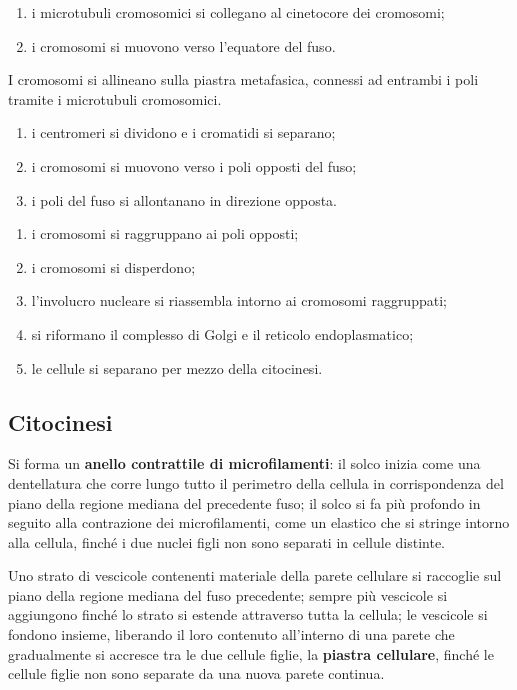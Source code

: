 \begin{enumerate}
  \item i microtubuli cromosomici si collegano al cinetocore dei cromosomi;
  \item i cromosomi si muovono verso l'equatore del fuso.
\end{enumerate}

I cromosomi si allineano sulla piastra metafasica, connessi ad entrambi i poli tramite i microtubuli cromosomici.

\begin{enumerate}
  \item i centromeri si dividono e i cromatidi si separano;
  \item i cromosomi si muovono verso i poli opposti del fuso;
  \item i poli del fuso si allontanano in direzione opposta.
\end{enumerate}

\begin{enumerate}
  \item i cromosomi si raggruppano ai poli opposti;
  \item i cromosomi si disperdono;
  \item l'involucro nucleare si riassembla intorno ai cromosomi raggruppati;
  \item si riformano il complesso di Golgi e il reticolo endoplasmatico;
  \item le cellule si separano per mezzo della citocinesi.
\end{enumerate}

\subsection{Citocinesi}

Si forma un \textbf{anello contrattile di microfilamenti}: il solco inizia come una dentellatura che corre lungo tutto il perimetro della cellula in corrispondenza del piano della regione mediana del precedente fuso; il solco si fa più profondo in seguito alla contrazione dei microfilamenti, come un elastico che si stringe intorno alla cellula, finché i due nuclei figli non sono separati in cellule distinte.

Uno strato di vescicole contenenti materiale della parete cellulare si raccoglie sul piano della regione mediana del fuso precedente; sempre più vescicole si aggiungono finché lo strato si estende attraverso tutta la cellula; le vescicole si fondono insieme, liberando il loro contenuto all'interno di una parete che gradualmente si accresce tra le due cellule figlie, la \textbf{piastra cellulare}, finché le cellule figlie non sono separate da una nuova parete continua.

